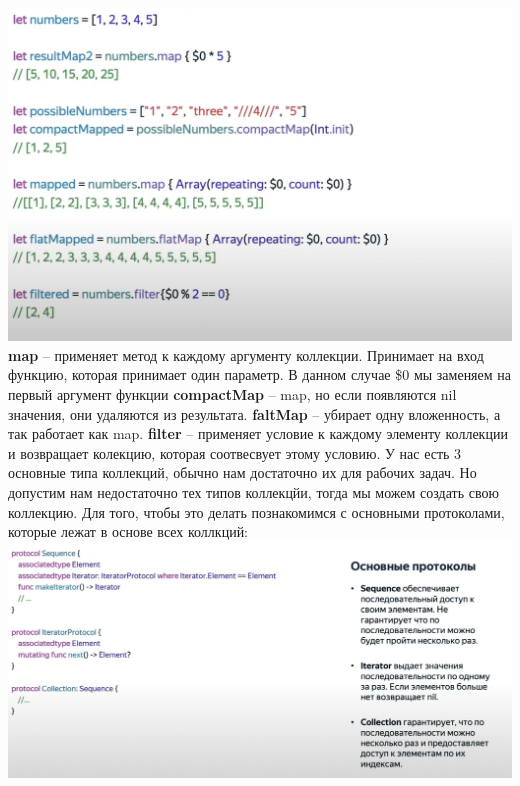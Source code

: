 \documentclass{article}
\begin{document}
    \includegraphics[scale = 0.5]{pic/Снимок экрана 2023-07-29 в 00.32.22.png}
    \newline
    \textbf{map} -- применяет метод к каждому аргументу коллекции. Принимает на вход функцию, которая принимает один параметр. В данном случае \$0 мы заменяем на первый аргумент функции  
    \newline
    \textbf{compactMap} -- map, но если появляются nil значения, они удаляются из результата. 
    \newline
    \textbf{faltMap} -- убирает одну вложенность, а так работает как map.
    \newline
    \textbf{filter} -- применяет условие к каждому элементу коллекции и возвращает колекцию, которая соотвесвует этому условию. 
    \newline
    У нас есть 3 основные типа коллекций, обычно нам достаточно их для рабочих задач. Но допустим нам недостаточно тех типов коллекцйи, тогда мы можем создать свою коллекцию. Для того, чтобы это делать познакомимся с основными протоколами, которые лежат в основе всех коллкций: 
    \newline
    \includegraphics[scale = 0.5]{pic/Снимок экрана 2023-07-29 в 00.36.28.png}
\end{document}
